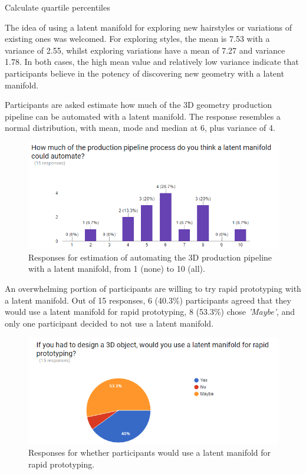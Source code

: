 \documentclass[ %
author={Dillon Keith Diep},
supervisor={Dr. Carl Henrik Ek},
degree={MEng},
title={ART-CG Hair:},
subtitle={Assisted Real-time Content Generation of Stylised Virtual Hair},
type={Research},
year={2017} ]{dissertation}
\begin{document}
{\color{red} Calculate quartile percentiles}

The idea of using a latent manifold for exploring new hairstyles or variations of existing ones was welcomed. For exploring styles, the mean is 7.53 with a variance of 2.55, whilst exploring variations have a mean of 7.27 and variance 1.78. In both cases, the high mean value and relatively low variance indicate that participants believe in the potency of discovering new geometry with a latent manifold.

Participants are asked estimate how much of the 3D geometry production pipeline can be automated with a latent manifold. The response resembles a normal distribution, with mean, mode and median at 6, plus variance of 4. 
\begin{figure}[!h]
	\centering
	\caption{Responses for estimation of automating the 3D production pipeline with a latent manifold, from 1 (none) to 10 (all).}
	\includegraphics[scale=0.7]{images/surveyAutomate}
\end{figure}

An overwhelming portion of participants are willing to try rapid prototyping with a latent manifold. Out of 15 responses, 6 (40.3\%) participants agreed that they would use a latent manifold for rapid prototyping, 8 (53.3\%) chose \textit{'Maybe'}, and only one participant decided to not use a latent manifold. 

\begin{figure}[!h]
	\centering
	\caption{Responses for whether participants would use a latent manifold for rapid prototyping.}
	\includegraphics[scale=0.7]{images/surveyPrototype}
\end{figure}
\end{document}
